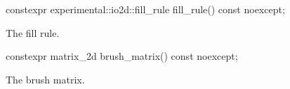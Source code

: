 %
\begin{itemdecl}
constexpr experimental::io2d::fill_rule fill_rule() const noexcept;
\end{itemdecl}
\begin{itemdescr}
\pnum
\returns
The fill rule.
\end{itemdescr}

%
\begin{itemdecl}
constexpr matrix_2d brush_matrix() const noexcept;
\end{itemdecl}
\begin{itemdescr}
\pnum
\returns
The brush matrix.
\end{itemdescr}
